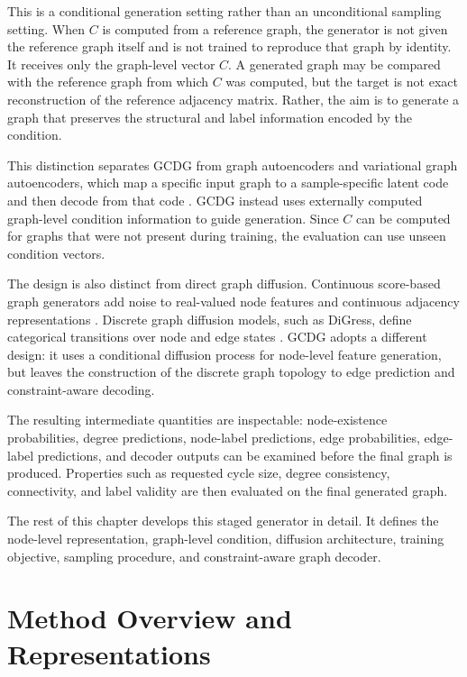 This is a conditional generation setting rather than an unconditional sampling
setting. When \(C\) is computed from a reference graph, the generator is not
given the reference graph itself and is not trained to reproduce that graph by
identity. It receives only the graph-level vector \(C\). A generated graph may
be compared with the reference graph from which \(C\) was computed, but the
target is not exact reconstruction of the reference adjacency matrix. Rather,
the aim is to generate a graph that preserves the structural and label
information encoded by the condition.

This distinction separates GCDG from graph autoencoders and variational graph
autoencoders, which map a specific input graph to a sample-specific latent code
and then decode from that code
\citep{kipf2016vgae,simonovsky2018graphvae}. GCDG instead uses externally
computed graph-level condition information to guide generation. Since \(C\) can
be computed for graphs that were not present during training, the evaluation can
use unseen condition vectors.

The design is also distinct from direct graph diffusion. Continuous score-based
graph generators add noise to real-valued node features and continuous
adjacency representations \citep{niu2020permutation,jo2022score}. Discrete graph
diffusion models, such as DiGress, define categorical transitions over node and
edge states \citep{vignac2022digress}. GCDG adopts a different design: it uses a
conditional diffusion process for node-level feature generation, but leaves the
construction of the discrete graph topology to edge prediction and
constraint-aware decoding.

The resulting intermediate quantities are inspectable: node-existence
probabilities, degree predictions, node-label predictions, edge probabilities,
edge-label predictions, and decoder outputs can be examined before the final
graph is produced. Properties such as requested cycle size, degree consistency,
connectivity, and label validity are then evaluated on the final
generated graph.

The rest of this chapter develops this staged generator in detail. It defines
the node-level representation, graph-level condition, diffusion architecture,
training objective, sampling procedure, and constraint-aware graph decoder.

\section{Method Overview and Representations}
\label{sec:generator:method-overview}

